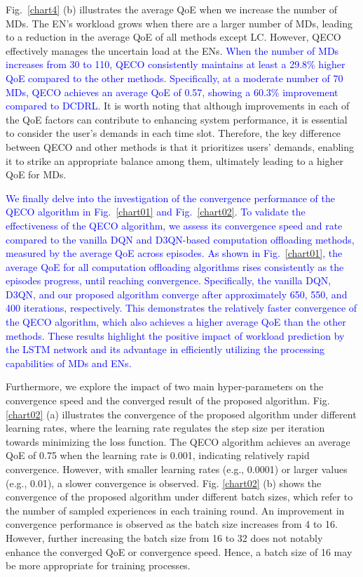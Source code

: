 \documentclass[10pt, journal,letterpaper]{IEEEtran}
\begin{document}
 Fig.~\ref{chart4} (b) illustrates the average QoE when we increase the number of MDs. The EN's workload grows when there are a larger number of MDs, leading to a reduction in the average QoE of all methods except LC. However, QECO effectively manages the uncertain load at the ENs. \textcolor{blue}{When the number of MDs increases from 30 to 110, QECO consistently maintains at least a 29.8\% higher QoE compared to the other methods. Specifically, at a moderate number of 70 MDs, QECO achieves an average QoE of 0.57, showing a 60.3\% improvement compared to DCDRL.} It is worth noting that although improvements in each of the QoE factors can contribute to enhancing system performance, it is essential to consider the user's demands in each time slot. Therefore, the key difference between QECO and other methods is that it prioritizes users' demands, enabling it to strike an appropriate balance among them, ultimately leading to a higher QoE for MDs.



\textcolor{blue}{We finally delve into the investigation of the convergence performance of the QECO algorithm in Fig.~\ref{chart01} and Fig.~\ref{chart02}. To validate the effectiveness of the QECO algorithm, we assess its convergence speed and rate compared to the vanilla DQN and D3QN-based computation offloading methods, measured by the average QoE across episodes. As shown in Fig.~\ref{chart01}, the average QoE for all computation offloading algorithms rises consistently as the episodes progress, until reaching convergence. Specifically, the vanilla DQN, D3QN, and our proposed algorithm converge after approximately 650, 550, and 400 iterations, respectively. This demonstrates the relatively faster convergence of the QECO algorithm, which also achieves a higher average QoE than the other methods. These results highlight the positive impact of workload prediction by the LSTM network and its advantage in efficiently utilizing the processing capabilities of MDs and ENs.}

Furthermore, we explore the impact of two main hyper-parameters on the convergence speed and the converged result of the proposed algorithm. Fig. \ref{chart02} (a) illustrates the convergence of the proposed algorithm under different learning rates, where the learning rate regulates the step size per iteration towards minimizing the loss function. The QECO algorithm achieves an average QoE of 0.75 when the learning rate is 0.001, indicating relatively rapid convergence. However, with smaller learning rates (e.g., 0.0001) or larger values (e.g., 0.01),  a slower convergence is observed. Fig. \ref{chart02} (b) shows the convergence of the proposed algorithm under different batch sizes, which refer to the number of sampled experiences in each training round. An improvement in convergence performance is observed as the batch size increases from 4 to 16. However, further increasing the batch size from 16 to 32 does not notably enhance the converged QoE or convergence speed. Hence, a batch size of 16 may be more appropriate for training processes.
\end{document}

